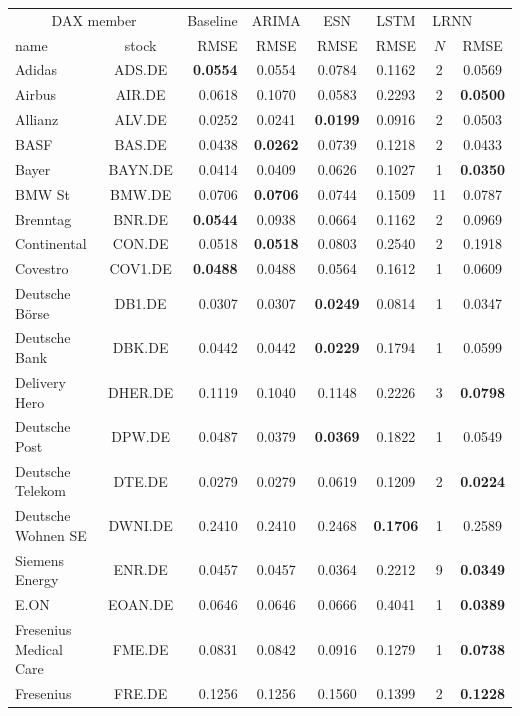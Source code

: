 \documentclass[preprint,12pt,times,authoryear]{elsarticle}%
\theoremstyle{definition}
\begin{document}
\begin{table}
\footnotesize
\begin{tabular}{l@{ }crccccc}
\toprule
\multicolumn{2}{c}{DAX member} & Baseline & ARIMA & ESN & LSTM & \multicolumn{2}{l}{LRNN}\\
name & stock & RMSE & RMSE & RMSE & RMSE & $N$ & RMSE\\ \midrule
Adidas & ADS.DE & \textbf{0.0554} & 0.0554 & 0.0784 & 0.1162 & 2 & 0.0569\\
Airbus & AIR.DE & 0.0618 & 0.1070 & 0.0583 & 0.2293 & 2 & \textbf{0.0500}\\
Allianz & ALV.DE & 0.0252 & 0.0241 & \textbf{0.0199} & 0.0916 & 2 & 0.0503\\
BASF & BAS.DE & 0.0438 & \textbf{0.0262} & 0.0739 & 0.1218 & 2 & 0.0433\\
Bayer & BAYN.DE & 0.0414 & 0.0409 & 0.0626 & 0.1027 & 1 & \textbf{0.0350}\\
BMW St & BMW.DE & 0.0706 & \textbf{0.0706} & 0.0744 & 0.1509 & 11 & 0.0787\\
Brenntag & BNR.DE & \textbf{0.0544} & 0.0938 & 0.0664 & 0.1162 & 2 & 0.0969\\
Continental & CON.DE & 0.0518 & \textbf{0.0518} & 0.0803 & 0.2540 & 2 & 0.1918\\
Covestro & COV1.DE & \textbf{0.0488} & 0.0488 & 0.0564 & 0.1612 & 1 & 0.0609\\
Deutsche Börse & DB1.DE & 0.0307 & 0.0307 & \textbf{0.0249} & 0.0814 & 1 & 0.0347\\
Deutsche Bank & DBK.DE & 0.0442 & 0.0442 & \textbf{0.0229} & 0.1794 & 1 & 0.0599\\
Delivery Hero & DHER.DE & 0.1119 & 0.1040 & 0.1148 & 0.2226 & 3 & \textbf{0.0798}\\
Deutsche Post & DPW.DE & 0.0487 & 0.0379 & \textbf{0.0369} & 0.1822 & 1 & 0.0549\\
Deutsche Telekom & DTE.DE & 0.0279 & 0.0279 & 0.0619 & 0.1209 & 2 & \textbf{0.0224}\\
Deutsche Wohnen SE & DWNI.DE & 0.2410 & 0.2410 & 0.2468 & \textbf{0.1706} & 1 & 0.2589\\
Siemens Energy & ENR.DE & 0.0457 & 0.0457 & 0.0364 & 0.2212 & 9 & \textbf{0.0349}\\
E.ON & EOAN.DE & 0.0646 & 0.0646 & 0.0666 & 0.4041 & 1 & \textbf{0.0389}\\
Fresenius Medical Care & FME.DE & 0.0831 & 0.0842 & 0.0916 & 0.1279 & 1 & \textbf{0.0738}\\
Fresenius & FRE.DE & 0.1256 & 0.1256 & 0.1560 & 0.1399 & 2 & \textbf{0.1228}\\

\end{tabular}
\end{table}
\end{document}
